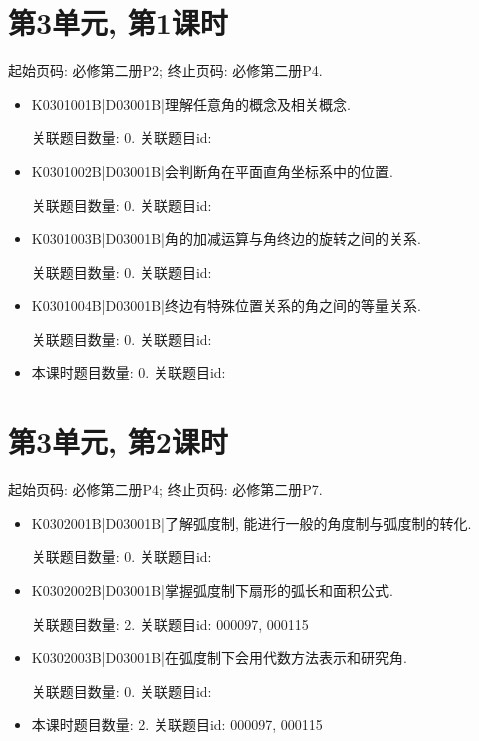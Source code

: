 \section*{第3单元, 第1课时}
起始页码: 必修第二册P2; 终止页码: 必修第二册P4.
\begin{itemize}
\item K0301001B|D03001B|理解任意角的概念及相关概念.

关联题目数量: 0. 关联题目id: 

\item K0301002B|D03001B|会判断角在平面直角坐标系中的位置.

关联题目数量: 0. 关联题目id: 

\item K0301003B|D03001B|角的加减运算与角终边的旋转之间的关系.

关联题目数量: 0. 关联题目id: 

\item K0301004B|D03001B|终边有特殊位置关系的角之间的等量关系.

关联题目数量: 0. 关联题目id: 

\item 本课时题目数量: 0. 关联题目id: 

\end{itemize}

\section*{第3单元, 第2课时}
起始页码: 必修第二册P4; 终止页码: 必修第二册P7.
\begin{itemize}
\item K0302001B|D03001B|了解弧度制, 能进行一般的角度制与弧度制的转化.

关联题目数量: 0. 关联题目id: 

\item K0302002B|D03001B|掌握弧度制下扇形的弧长和面积公式.

关联题目数量: 2. 关联题目id: 000097, 000115

\item K0302003B|D03001B|在弧度制下会用代数方法表示和研究角.

关联题目数量: 0. 关联题目id: 

\item 本课时题目数量: 2. 关联题目id: 000097, 000115

\end{itemize}

